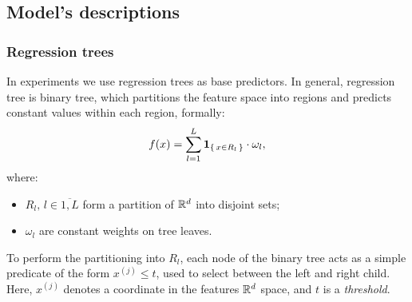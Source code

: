 \subsection{Model's descriptions}

\subsubsection{Regression trees} %
\label{model:regression-tree}

In experiments we use regression trees as base predictors. In general, regression tree is binary tree, which partitions the feature space into regions and predicts constant values within each region, formally:
\begin{equation}
    f(x)
    =
    \sum\limits_{l=1}^{L}\mathbf{1}_{\set{x \in R_l}}\cdot\omega_l,
\end{equation}
where:
\begin{itemize}
    \item \(R_l,\, l \in \overline{1, L}\) form a partition of \(\mathbb{R}^d\) into disjoint sets;
    \item \(\omega_l\) are constant weights on tree leaves.
\end{itemize}

To perform the partitioning into \( R_l \), each node of the binary tree acts as a simple predicate of the form \( x^{(j)} \le t \), used to select between the left and right child. Here, \( x^{(j)} \) denotes a coordinate in the features \( \mathbb{R}^d \) space, and \( t \) is a \emph{threshold}.


